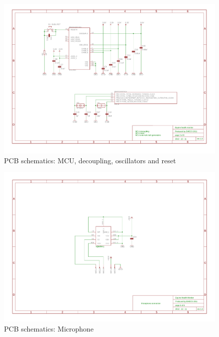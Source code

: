 \begin{figure}[htb]
\centering
\includegraphics[width=\columnwidth]{Images/pcb_mcu_osc_reset}
\caption{PCB schematics: MCU, decoupling, oscillators and reset}
\label{fig:pcb_schematics_4}
\end{figure}

\begin{figure}[htb]
\centering
\includegraphics[width=\columnwidth]{Images/pcb_mic}
\caption{PCB schematics: Microphone}
\label{fig:pcb_schematics_5}
\end{figure}

